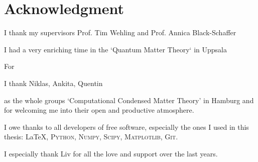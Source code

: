 \documentclass[../main.tex]{subfiles}
\begin{document}
	
\chapter*{Acknowledgment}

I thank my supervisors Prof. Tim Wehling and Prof. Annica Black-Schaffer

I had a very enriching time in the `Quantum Matter Theory` in Uppsala

For 

I thank Niklas, Ankita, Quentin

as the whole groups `Computational Condensed Matter Theory' in Hamburg and  for welcoming me into their open and  productive atmosphere.


I owe thanks to all developers of free software, especially the ones I used in this thesis: \LaTeX, \textsc{Python}, \textsc{Numpy}, \textsc{Scipy}, \textsc{Matplotlib}, \textsc{Git}.

I especially thank Liv for all the love and support over the last years.
\end{document}
